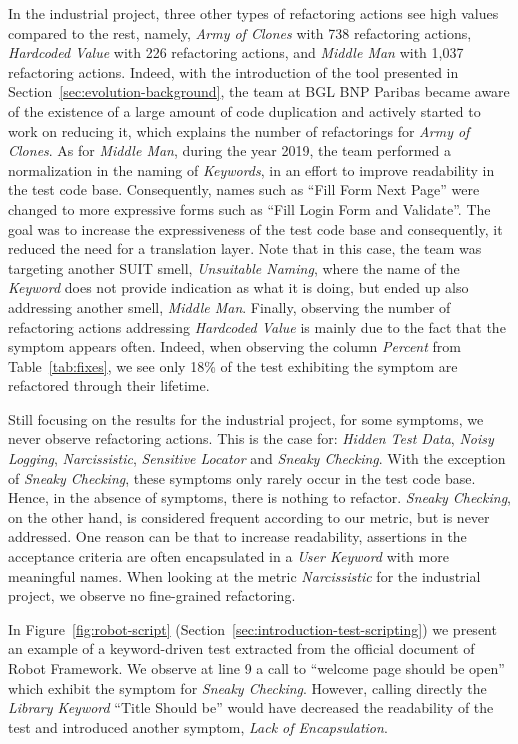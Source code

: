 In the industrial project, three other types of refactoring actions see high values compared to the rest, namely, \emph{Army of Clones} with 738 refactoring actions, \emph{Hardcoded Value} with 226 refactoring actions, and \emph{Middle Man} with 1,037 refactoring actions. Indeed, with the introduction of the tool presented in Section~\ref{sec:evolution-background}, the team at BGL BNP Paribas became aware of the existence of a large amount of code duplication and actively started to work on reducing it, which explains the number of refactorings for \emph{Army of Clones}. As for \emph{Middle Man}, during the year 2019, the team performed a normalization in the naming of \emph{Keywords}, in an effort to improve readability in the test code base. Consequently, names such as ``Fill Form Next Page'' were changed to more expressive forms such as ``Fill Login Form and Validate''. The goal was to increase the expressiveness of the test code base and consequently, it reduced the need for a translation layer. Note that in this case, the team was targeting another SUIT smell, \emph{Unsuitable Naming}, where the name of the \emph{Keyword} does not provide indication as what it is doing, but ended up also addressing another smell, \emph{Middle Man}. Finally, observing the number of refactoring actions addressing \emph{Hardcoded Value} is mainly due to the fact that the symptom appears often. Indeed, when observing the column \emph{Percent} from Table~\ref{tab:fixes}, we see only 18\% of the test exhibiting the symptom are refactored through their lifetime. 

Still focusing on the results for the industrial project, for some symptoms, we never observe refactoring actions. This is the case for: \emph{Hidden Test Data}, \emph{Noisy Logging}, \emph{Narcissistic}, \emph{Sensitive Locator} and \emph{Sneaky Checking}. With the exception of \emph{Sneaky Checking}, these symptoms only rarely occur in the test code base. Hence, in the absence of symptoms, there is nothing to refactor. \emph{Sneaky Checking}, on the other hand, is considered frequent according to our metric, but is never addressed. One reason can be that to increase readability, assertions in the acceptance criteria are often encapsulated in a \emph{User Keyword} with more meaningful names. When looking at the metric \emph{Narcissistic} for the industrial project, we observe no fine-grained refactoring. 

In Figure~\ref{fig:robot-script} (Section~\ref{sec:introduction-test-scripting}) we present an example of a keyword-driven test extracted from the official document of Robot Framework. We observe at line 9 a call to ``welcome page should be open'' which exhibit the symptom for \emph{Sneaky Checking}. However, calling directly the \emph{Library Keyword} ``Title Should be'' would have decreased the readability of the test and introduced another symptom, \emph{Lack of Encapsulation}.

